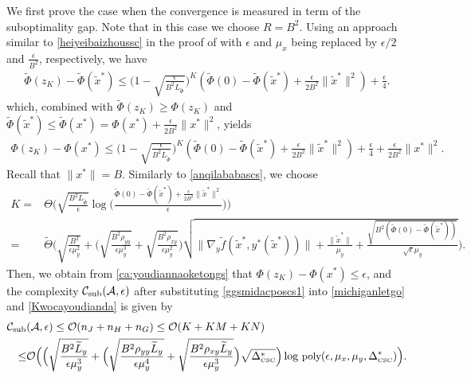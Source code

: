 \documentclass{osudissert96}
\begin{document}
We first prove the case when the convergence is measured in term of the suboptimality gap. Note that in this case we choose $R=B^2$. Using an approach similar to \cref{heiyeibaizhoussc} in the proof of  with $\epsilon$ and $\mu_x$ being replaced by $\epsilon/2$ and  $\frac{\epsilon}{B^2}$, respectively, we have %
\begin{align*}
\widetilde\Phi(z_K)- \widetilde\Phi(\widetilde x^*) \leq \Big(1 -\sqrt{\frac{\epsilon}{B^2L_{\widetilde \Phi}}} \Big)^{K}(\widetilde\Phi(0) -\widetilde\Phi(\widetilde x^*)+\frac{\epsilon}{2B^2} \|\widetilde x^*\|^2) +\frac{\epsilon}{4}.
\end{align*}
which, combined with $\widetilde\Phi(z_K)\geq\Phi(z_K)$ and $\widetilde\Phi(\widetilde x^*)\leq\widetilde\Phi(x^*)=\Phi(x^*)+\frac{\epsilon}{2B^2}\|x^*\|^2$, yields
{\small\begin{align}\label{ca:youdiannaoketongs}
\Phi(z_K) - \Phi(x^*)\leq \Big(1 -\sqrt{\frac{\epsilon}{B^2L_{\widetilde \Phi}}} \Big)^{K}(\widetilde\Phi(0) -\widetilde\Phi(\widetilde x^*)+\frac{\epsilon}{2B^2} \|\widetilde x^*\|^2) +\frac{\epsilon}{4}+\frac{\epsilon}{2B^2}\|x^*\|^2.
\end{align}}
\hspace{-0.13cm}Recall that $\|x^*\|=B$. Similarly to \cref{anqilababascs}, we choose
{\footnotesize
\begin{align}\label{Kwocayoudianda}
K =& \Theta\Big( \sqrt{\frac{B^2L_{\widetilde \Phi}}{\epsilon}}\log\Big(\frac{\widetilde\Phi(0) -\widetilde\Phi(\widetilde x^*)+\frac{\epsilon}{2B^2} \|\widetilde x^*\|^2}{\epsilon}\Big)\Big) \nonumber
\\=&\widetilde \Theta \Big(\sqrt{\frac{B^2}{\epsilon\mu_y^2}}+\Big(\sqrt{\frac{B^2\rho_{yy}}{\epsilon\mu_y^{3}}} +  \sqrt{\frac{B^2\rho_{xy}}{\epsilon\mu_y^2}}\Big)\sqrt{\|\nabla_y \widetilde f(\widetilde x^*,y^*(\widetilde x^*))\|+\frac{\|\widetilde x^*\|}{\mu_y}+\frac{\sqrt{B^2(\widetilde\Phi(0)-\widetilde\Phi(\widetilde x^*))}}{\sqrt{\epsilon}\mu_y}}\Big).
\end{align}}
\hspace{-0.13cm}Then,  we obtain from \cref{ca:youdiannaoketongs} that $\Phi(z_K) - \Phi(x^*)\leq \epsilon$, and the complexity $\mathcal{C}_{\text{\normalfont sub}}(\mathcal{A},\epsilon)$ after substituting \cref{ggsmidacposcs1} into \cref{michiganletgo} and \cref{Kwocayoudianda} is given by 
\begin{align}
\mathcal{C}_{\text{\normalfont sub}}&(\mathcal{A},\epsilon) \leq \mathcal{O}(n_J+n_H + n_G)\leq \mathcal{O}(K+KM+KN)   \nonumber
\\\leq& \mathcal{O}\Big( \Big( \sqrt{\frac{B^2\widetilde L_y}{\epsilon\mu_y^3}}+\Big(\sqrt{\frac{B^2\rho_{yy}\widetilde L_y}{\epsilon\mu_y^{4}}} +  \sqrt{\frac{B^2\rho_{xy}\widetilde L_y}{\epsilon\mu_y^3}}\Big)\sqrt{\Delta^*_{\text{\normalfont\tiny CSC}}}\Big)\log\, {\small \text{poly}(\epsilon,\mu_x,\mu_y,\Delta^*_{\text{\normalfont\tiny CSC}})}\Big).
\end{align}
\end{document}
